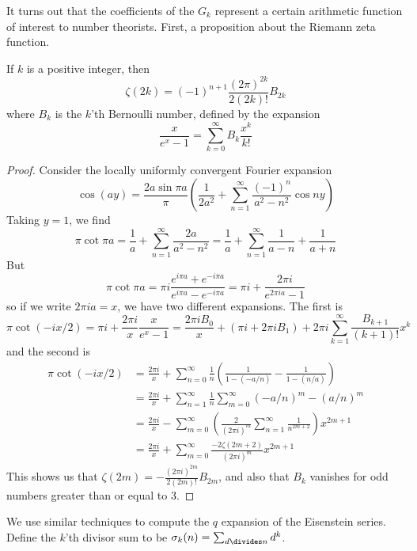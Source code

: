 It turns out that the coefficients of the $G_k$ represent a certain arithmetic function of interest to number theorists. First, a proposition about the Riemann zeta function.

\begin{lemma}
    If $k$ is a positive integer, then
    \[ \zeta(2k) = (-1)^{n+1} \frac{(2 \pi)^{2k}}{2 (2k)!} B_{2k} \]
    where $B_k$ is the $k$'th Bernoulli number, defined by the expansion
    \[ \frac{x}{e^x - 1} = \sum_{k = 0}^\infty B_k \frac{x^k}{k!} \]
\end{lemma}
\begin{proof}
    Consider the locally uniformly convergent Fourier expansion
    \[ \cos(a y) = \frac{2 a \sin \pi a}{\pi} \left( \frac{1}{2 a^2} + \sum_{n = 1}^\infty \frac{(-1)^n}{a^2 - n^2} \cos ny \right) \]
    Taking $y = 1$, we find
    \[ \pi \cot \pi a = \frac{1}{a} + \sum_{n = 1}^\infty \frac{2a}{a^2 - n^2} = \frac{1}{a} + \sum_{n = 1}^\infty \frac{1}{a - n} + \frac{1}{a + n} \]
    But
    \[ \pi \cot \pi a = \pi i \frac{e^{i \pi a} + e^{- i \pi a}}{e^{i \pi a} - e^{- i \pi a}} = \pi i + \frac{2 \pi i}{e^{2 \pi i a} - 1} \]
    so if we write $2 \pi i a = x$, we have two different expansions. The first is
    \[ \pi \cot(-ix/2) = \pi i + \frac{2 \pi i}{x} \frac{x}{e^x - 1} = \frac{2 \pi i B_0}{x} + (\pi i + 2 \pi i B_1) + 2 \pi i \sum_{k = 1}^\infty \frac{B_{k+1}}{(k+1)!} x^k \]
    and the second is
    \begin{align*}
        \pi \cot(-ix/2) &= \frac{2 \pi i}{x} + \sum_{n = 0}^\infty \frac{1}{n} \left( \frac{1}{1 - (-a/n)} - \frac{1}{1 - (n/a)} \right)\\
        &= \frac{2 \pi i}{x}  + \sum_{n = 1}^\infty \frac{1}{n} \sum_{m = 0}^\infty (-a/n)^m - (a/n)^m\\
        &= \frac{2 \pi i}{x} - \sum_{m = 0}^\infty \left( \frac{2}{(2 \pi i)^m} \sum_{n = 1}^\infty \frac{1}{n^{2m + 2}} \right) x^{2m + 1}\\
        &= \frac{2 \pi i}{x} + \sum_{m = 0}^\infty \frac{-2 \zeta(2m + 2)}{(2 \pi i)^m} x^{2m + 1}
    \end{align*}
    This shows us that $\zeta(2m) = - \frac{(2 \pi i)^{2m}}{2 (2m)!} B_{2m}$, and also that $B_k$ vanishes for odd numbers greater than or equal to $3$.
\end{proof}

We use similar techniques to compute the $q$ expansion of the Eisenstein series. Define the $k$'th divisor sum to be $\sigma_k(n) = \sum_{d \divides n} d^k$.

